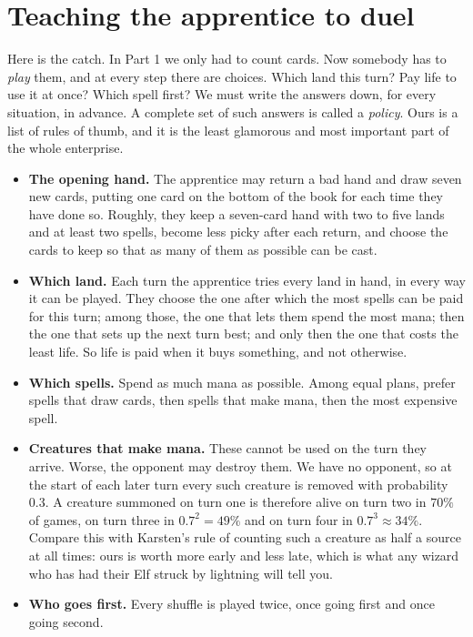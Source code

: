 \documentclass[
    a4paper,
    DIV=13,
    abstract=true,
    numbers=noenddot
]{scrartcl}
\begin{document}
\section{Teaching the apprentice to duel}
Here is the catch. In Part 1 we only had to count cards. Now somebody has to \emph{play} them, and at every step there are choices. Which land this turn? Pay life to use it at once? Which spell first? We must write the answers down, for every situation, in advance. A complete set of such answers is called a \emph{policy}. Ours is a list of rules of thumb, and it is the least glamorous and most important part of the whole enterprise.
\begin{itemize}
  \item \textbf{The opening hand.} The apprentice may return a bad hand and draw seven new cards, putting one card on the bottom of the book for each time they have done so. Roughly, they keep a seven-card hand with two to five lands and at least two spells, become less picky after each return, and choose the cards to keep so that as many of them as possible can be cast.
  \item \textbf{Which land.} Each turn the apprentice tries every land in hand, in every way it can be played. They choose the one after which the most spells can be paid for this turn; among those, the one that lets them spend the most mana; then the one that sets up the next turn best; and only then the one that costs the least life. So life is paid when it buys something, and not otherwise.
  \item \textbf{Which spells.} Spend as much mana as possible. Among equal plans, prefer spells that draw cards, then spells that make mana, then the most expensive spell.
  \item \textbf{Creatures that make mana.} These cannot be used on the turn they arrive. Worse, the opponent may destroy them. We have no opponent, so at the start of each later turn every such creature is removed with probability $0.3$. A creature summoned on turn one is therefore alive on turn two in $70\%$ of games, on turn three in $0.7^2=49\%$ and on turn four in $0.7^3\approx34\%$. Compare this with Karsten's rule of counting such a creature as half a source at all times: ours is worth more early and less late, which is what any wizard who has had their Elf struck by lightning will tell you.
  \item \textbf{Who goes first.} Every shuffle is played twice, once going first and once going second.
\end{itemize}
\end{document}
